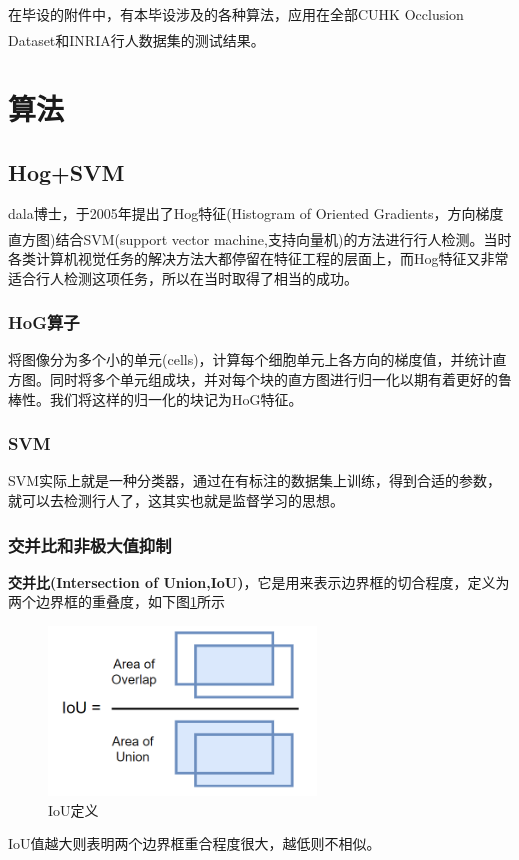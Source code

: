 \documentclass[12pt,a4paper,titlepage]{article}
\newcommand{\upcite}[1]{\textsuperscript{\textsuperscript{\cite{#1}}}}  %
\begin{document}
在毕设的附件中，有本毕设涉及的各种算法，应用在全部CUHK Occlusion Dataset和INRIA\upcite{dalal2005histograms}行人数据集的测试结果。

\section{算法}
\subsection{Hog+SVM}
dala博士，于2005年提出了Hog特征(Histogram of Oriented Gradients，方向梯度直方图)结合SVM(support vector machine,支持向量机)的方法进行行人检测\upcite{dalal2005histograms}。当时各类计算机视觉任务的解决方法大都停留在特征工程的层面上，而Hog特征又非常适合行人检测这项任务，所以在当时取得了相当的成功。
\subsubsection{HoG算子}
将图像分为多个小的单元(cells)，计算每个细胞单元上各方向的梯度值，并统计直方图。同时将多个单元组成块，并对每个块的直方图进行归一化以期有着更好的鲁棒性。我们将这样的归一化的块记为HoG特征。
\subsubsection{SVM}
SVM实际上就是一种分类器，通过在有标注的数据集上训练，得到合适的参数，就可以去检测行人了，这其实也就是监督学习的思想。
\subsubsection{交并比和非极大值抑制}
\textbf{交并比(Intersection of Union,IoU)}，它是用来表示边界框的切合程度，定义为两个边界框的重叠度，如下图\ref{fig:iou}所示
\begin{figure}[h]
\centering
\includegraphics[height=4.5cm]{img/iou.png}
\caption{IoU定义}
\label{fig:iou}
\end{figure}

IoU值越大则表明两个边界框重合程度很大，越低则不相似。
\end{document}
